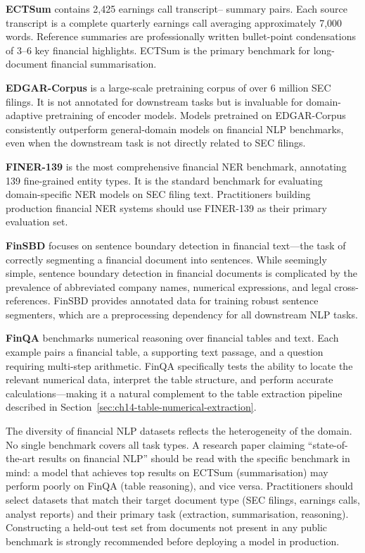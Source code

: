 \textbf{ECTSum} \citep{mukherjee2022ectsum} contains 2,425 earnings call transcript--
summary pairs. Each source transcript is a complete quarterly earnings call averaging
approximately 7,000 words. Reference summaries are professionally written bullet-point
condensations of 3--6 key financial highlights. ECTSum is the primary benchmark for
long-document financial summarisation.

\textbf{EDGAR-Corpus} \citep{loukas2021edgar} is a large-scale pretraining corpus of
over 6 million SEC filings. It is not annotated for downstream tasks but is invaluable
for domain-adaptive pretraining of encoder models. Models pretrained on EDGAR-Corpus
consistently outperform general-domain models on financial NLP benchmarks, even when
the downstream task is not directly related to SEC filings.

\textbf{FINER-139} \citep{loukas2022finer} is the most comprehensive financial NER
benchmark, annotating 139 fine-grained entity types. It is the standard benchmark for
evaluating domain-specific NER models on SEC filing text. Practitioners building
production financial NER systems should use FINER-139 as their primary evaluation set.

\textbf{FinSBD} \citep{finsbd2020} focuses on sentence boundary detection in financial
text---the task of correctly segmenting a financial document into sentences. While
seemingly simple, sentence boundary detection in financial documents is complicated by
the prevalence of abbreviated company names, numerical expressions, and legal
cross-references. FinSBD provides annotated data for training robust sentence
segmenters, which are a preprocessing dependency for all downstream NLP tasks.

\textbf{FinQA} \citep{chen2021finqa} benchmarks numerical reasoning over financial
tables and text. Each example pairs a financial table, a supporting text passage, and a
question requiring multi-step arithmetic. FinQA specifically tests the ability to locate
the relevant numerical data, interpret the table structure, and perform accurate
calculations---making it a natural complement to the table extraction pipeline described
in Section~\ref{sec:ch14-table-numerical-extraction}.

\begin{remark}
\label{rem:dataset-selection}
The diversity of financial NLP datasets reflects the heterogeneity of the domain. No
single benchmark covers all task types. A research paper claiming ``state-of-the-art
results on financial NLP'' should be read with the specific benchmark in mind: a
model that achieves top results on ECTSum (summarisation) may perform poorly on FinQA
(table reasoning), and vice versa. Practitioners should select datasets that match
their target document type (SEC filings, earnings calls, analyst reports) and their
primary task (extraction, summarisation, reasoning). Constructing a held-out test set
from documents not present in any public benchmark is strongly recommended before
deploying a model in production.
\end{remark}

